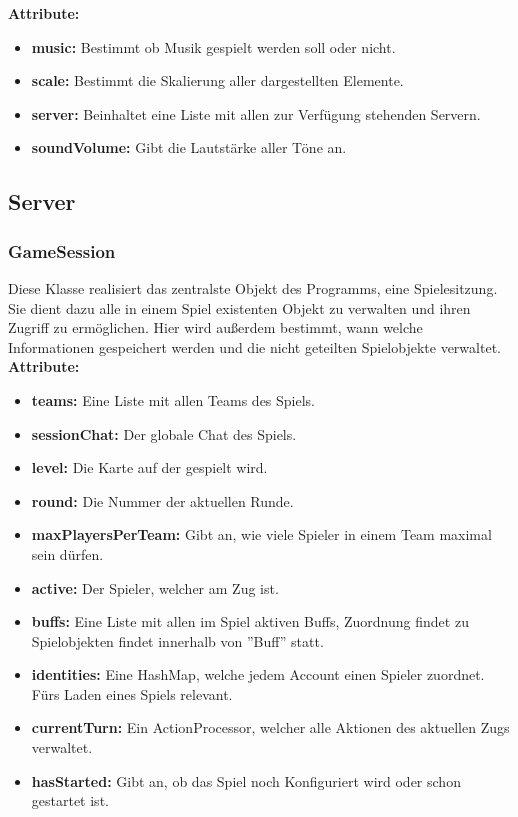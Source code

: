 \documentclass[fontsize=12pt,paper=a4,twoside]{scrartcl}
\begin{document}
\textbf{Attribute:}
\begin{itemize}
	\item \textbf{music:} Bestimmt ob Musik gespielt werden soll oder nicht.
	\item \textbf{scale:} Bestimmt die Skalierung aller dargestellten Elemente.
	\item \textbf{server:} Beinhaltet eine Liste mit allen zur Verfügung stehenden Servern.
	\item \textbf{soundVolume:} Gibt die Lautstärke aller Töne an. 
\end{itemize}

\subsection{Server}

\subsubsection{GameSession}

Diese Klasse realisiert das zentralste Objekt des Programms, eine Spielesitzung. Sie dient dazu alle in einem Spiel existenten Objekt zu verwalten und ihren Zugriff zu ermöglichen. Hier wird außerdem bestimmt, wann welche Informationen gespeichert werden und die nicht geteilten Spielobjekte verwaltet. \\

\textbf{Attribute:}
\begin{itemize}
\item \textbf{teams:} Eine Liste mit allen Teams des Spiels.
\item \textbf{sessionChat:} Der globale Chat des Spiels.
\item \textbf{level:} Die Karte auf der gespielt wird.
\item \textbf{round:} Die Nummer der aktuellen Runde.
\item \textbf{maxPlayersPerTeam:} Gibt an, wie viele Spieler in einem Team maximal sein dürfen.
\item \textbf{active:} Der Spieler, welcher am Zug ist.
\item \textbf{buffs:} Eine Liste mit allen im Spiel aktiven Buffs, Zuordnung findet zu Spielobjekten findet innerhalb von ''Buff'' statt.
\item \textbf{identities:} Eine HashMap, welche jedem Account einen Spieler zuordnet. Fürs Laden eines Spiels relevant.
\item \textbf{currentTurn:} Ein ActionProcessor, welcher alle Aktionen des aktuellen Zugs verwaltet.
\item \textbf{hasStarted:} Gibt an, ob das Spiel noch Konfiguriert wird oder schon gestartet ist.
\end{itemize}
\end{document}
